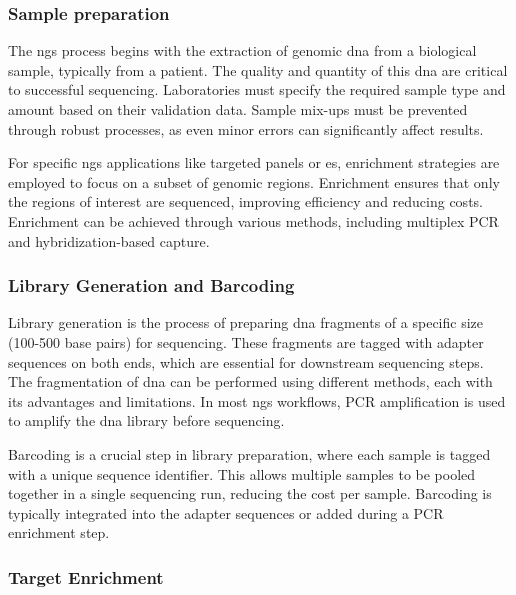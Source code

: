 \subsubsection{\textbf{Sample preparation}} \label{subsubsec:ngs_sample}

The \ac{ngs} process begins with the extraction of genomic \ac{dna} from a biological sample, typically from a patient. The quality and quantity of this \ac{dna} are critical to successful sequencing. Laboratories must specify the required sample type and amount based on their validation data. Sample mix-ups must be prevented through robust processes, as even minor errors can significantly affect results. \cite{Rehm2013}

For specific \ac{ngs} applications like targeted panels or \ac{es}, enrichment strategies are employed to focus on a subset of genomic regions. Enrichment ensures that only the regions of interest are sequenced, improving efficiency and reducing costs. Enrichment can be achieved through various methods, including multiplex PCR and hybridization-based capture. \cite{Rehm2013}

\subsubsection{\textbf{Library Generation and Barcoding}} \label{subsubsec:ngs_library}

Library generation is the process of preparing \ac{dna} fragments of a specific size (100-500 base pairs) for sequencing. These fragments are tagged with adapter sequences on both ends, which are essential for downstream sequencing steps. The fragmentation of \ac{dna} can be performed using different methods, each with its advantages and limitations. In most \ac{ngs} workflows, PCR amplification is used to amplify the \ac{dna} library before sequencing. \cite{Rehm2013}

Barcoding is a crucial step in library preparation, where each sample is tagged with a unique sequence identifier. This allows multiple samples to be pooled together in a single sequencing run, reducing the cost per sample. Barcoding is typically integrated into the adapter sequences or added during a PCR enrichment step. \cite{Rehm2013}

\subsubsection{\textbf{Target Enrichment}} \label{subsubsec:ngs_enrichment}

